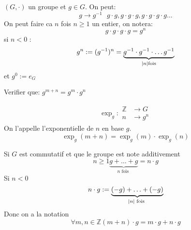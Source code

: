 \documentclass[../main.tex]{subfiles}
\begin{document}
\begin{defn}\label{defn:notation_exponentielle}
	$(G,\cdot)$ un groupe et $g\in G$. On peut:
	\[ 
		g \to g^{-1} \text{  } g\cdot g, g\cdot g \cdot g, g\cdot g \cdot g \cdot g \ldots
	\]
	On peut faire ca $n$ fois $n \geq 1$ un entier, on notera:
	\[ 
 g\cdot g \cdot g \cdot g = g^{n}
	\]
	si $n < 0$ :
	\[ 
		g^{n} := ( g^{-1})^{n} = \underbrace{g^{-1} \cdot g^{-1} \cdot \ldots  g^{-1}}_{\left\vert n\right\vert \text{fois}}
	\]
	et $g^{0}:=e_G$
\end{defn}
\begin{exo}
	Verifier que: $g^{m+n}= g^{m}\cdot g^{n}$
\end{exo}

\begin{defn}[exponentielle]\label{defn:exponentielle}
	
	\begin{align*}
	\exp_g:
	\begin{aligned}
	\mathbb{Z} &\to G\\
	n &\to g^{n}
	\end{aligned}
	\end{align*}
	On l'appelle l'exponentielle de $n$ en base $g$.
	\[ 
		\exp_g(m+n) = \exp_g(m) \cdot \exp_g(n)
	\]
\end{defn}
\begin{defn}\label{defn:notation_multiple}
	Si $G $ est commutatif et que le groupe est note additivement
	\[ 
	n \geq 1	\underbrace{ g+ \ldots + g }_{n \text{ fois }} = n \cdot g
	\]
	Si $n< 0$ 
	\[ 
		n\cdot g := \underbrace{ (-g) + \ldots + (-g) }_{\left\vert n\right\vert \text{ fois }}
	\]
	Donc on a la notation
	\[ 
		\forall m,n \in \mathbb{Z} (m+n)\cdot g = m\cdot g + n \cdot g
	\]
\end{defn}
\end{document}
